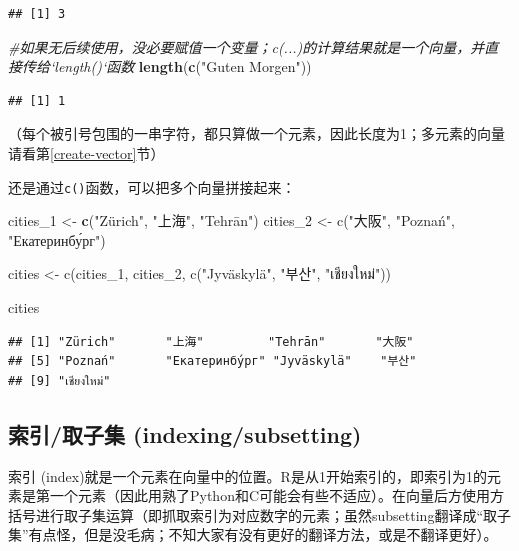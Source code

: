 \documentclass[]{book}
\newenvironment{Shaded}{\begin{snugshade}}{\end{snugshade}}
\newcommand{\CommentTok}[1]{\textcolor[rgb]{0.56,0.35,0.01}{\textit{#1}}}
\newcommand{\DecValTok}[1]{\textcolor[rgb]{0.00,0.00,0.81}{#1}}
\newcommand{\KeywordTok}[1]{\textcolor[rgb]{0.13,0.29,0.53}{\textbf{#1}}}
\newcommand{\NormalTok}[1]{#1}
\newcommand{\StringTok}[1]{\textcolor[rgb]{0.31,0.60,0.02}{#1}}
\begin{document}
\begin{verbatim}
## [1] 3
\end{verbatim}

\begin{Shaded}
\begin{Highlighting}[]
\CommentTok{#如果无后续使用，没必要赋值一个变量；c(...)的计算结果就是一个向量，并直接传给`length()`函数}
\KeywordTok{length}\NormalTok{(}\KeywordTok{c}\NormalTok{(}\StringTok{"Guten Morgen"}\NormalTok{)) }
\end{Highlighting}
\end{Shaded}

\begin{verbatim}
## [1] 1
\end{verbatim}

（每个被引号包围的一串字符，都只算做一个元素，因此长度为1；多元素的向量请看第\ref{create-vector}节）

还是通过\texttt{c()}函数，可以把多个向量拼接起来：

\begin{Shaded}
\begin{Highlighting}[]
\NormalTok{cities_}\DecValTok{1}\NormalTok{ <-}\StringTok{ }\KeywordTok{c}\NormalTok{(}\StringTok{"Zürich", "}\NormalTok{上海}\StringTok{", "}\NormalTok{Tehrān}\StringTok{")}
\StringTok{cities_2 <- c("}\NormalTok{大阪}\StringTok{", "}\NormalTok{Poznań}\StringTok{", "}\NormalTok{Екатеринбу́рг}\StringTok{")}

\StringTok{cities <- c(cities_1, cities_2, c("}\NormalTok{Jyväskylä}\StringTok{", "}\NormalTok{부산}\StringTok{", "}\NormalTok{เชียงใหม่}\StringTok{"))}

\StringTok{cities}
\end{Highlighting}
\end{Shaded}

\begin{verbatim}
## [1] "Zürich"       "上海"         "Tehrān"       "大阪"        
## [5] "Poznań"       "Екатеринбу́рг" "Jyväskylä"    "부산"        
## [9] "เชียงใหม่"
\end{verbatim}

\hypertarget{indexing}{%
\subsection{索引/取子集 (indexing/subsetting)}\label{indexing}}

索引 (index)就是一个元素在向量中的位置。R是从1开始索引的，即索引为1的元素是第一个元素（因此用熟了Python和C可能会有些不适应）。在向量后方使用方括号进行取子集运算（即抓取索引为对应数字的元素；虽然subsetting翻译成``取子集''有点怪，但是没毛病；不知大家有没有更好的翻译方法，或是不翻译更好）。
\end{document}
